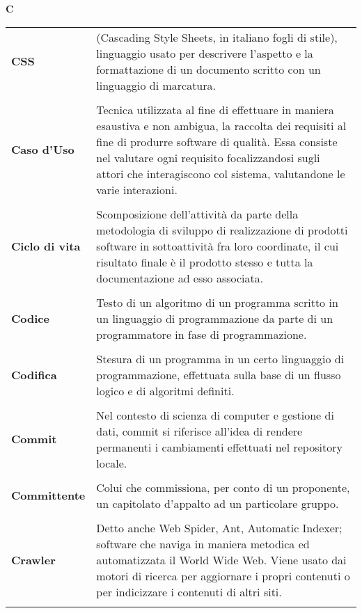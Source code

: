 {\begin{longtable}{L{4cm} p{10cm}}
 \\ 
\end{longtable} 
\newpage 
{} 
{} 
\hfill\Huge{\textbf{C}} \\ 
\normalsize 
\begin{longtable}{L{4cm} p{10cm}}
\textbf{CSS} & (Cascading Style Sheets, in italiano fogli di stile), linguaggio usato per descrivere l’aspetto e la formattazione di un documento scritto con un linguaggio di marcatura. \\ 
 \\ 
\textbf{Caso d'Uso} & Tecnica utilizzata al fine di effettuare in maniera esaustiva e non ambigua, la raccolta dei requisiti al fine di produrre software di qualità. Essa consiste nel valutare ogni requisito focalizzandosi sugli attori che interagiscono col sistema, valutandone le varie interazioni. \\ 
 \\ 
\textbf{Ciclo di vita} & Scomposizione dell'attività da parte della metodologia di sviluppo di realizzazione di prodotti software in sottoattività fra loro coordinate, il cui risultato finale è il prodotto stesso e tutta la documentazione ad esso associata. \\ 
 \\ 
\textbf{Codice} & Testo di un algoritmo di un programma scritto in un linguaggio di programmazione da parte di un programmatore in fase di programmazione. \\ 
 \\ 
\textbf{Codifica} & Stesura di un programma in un certo linguaggio di programmazione, effettuata sulla base di un flusso logico e di algoritmi definiti. \\ 
 \\ 
\textbf{Commit} & Nel contesto di scienza di computer e gestione di dati, commit si riferisce all’idea di rendere permanenti i cambiamenti effettuati nel repository locale. \\ 
 \\ 
\textbf{Committente} & Colui che commissiona, per conto di un proponente, un capitolato d’appalto ad un particolare gruppo. \\ 
 \\ 
\textbf{Crawler} & Detto anche Web Spider, Ant, Automatic Indexer; software che naviga in maniera metodica ed automatizzata il World Wide Web. Viene usato dai motori di ricerca per aggiornare i propri contenuti o per indicizzare i contenuti di altri siti. \\ 
 \\ 

\end{longtable}}
